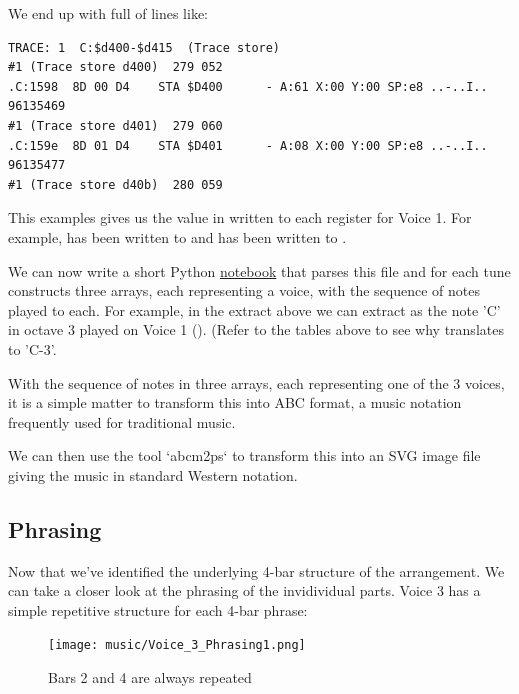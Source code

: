 \begin{definition}
We end up with  full of lines like:

\begin{lstlisting}[basicstyle=\tiny,escapechar=\%]
TRACE: 1  C:$d400-$d415  (Trace store)
#1 (Trace store d400)  279 052
.C:1598  8D 00 D4    STA $D400      - A:61 X:00 Y:00 SP:e8 ..-..I..   96135469
#1 (Trace store d401)  279 060
.C:159e  8D 01 D4    STA $D401      - A:08 X:00 Y:00 SP:e8 ..-..I..   96135477
#1 (Trace store d40b)  280 059
\end{lstlisting}

This examples gives us the value in  written to each register for Voice 1. For example, 
has been written to  and  has been written to .

We can now write a short Python \href{https://github.com/mwenge/iatheory/tree/main/notebooks}{notebook} that
parses this file and for each tune constructs three arrays, each representing a voice, with the sequence
of notes played to each. For example, in the extract above we can extract  as the note 'C'
in octave 3 played on Voice 1 (). (Refer to the tables above to see why 
translates to 'C-3'.

With the sequence of notes in three arrays, each representing one of the 3 voices, it is a simple
matter to transform this into ABC format, a music notation frequently used for traditional music.



We can then use the tool `abcm2ps` to transform this into an SVG image file giving the music in
standard Western notation.

\end{definition}

\subsection{Phrasing}
Now that we've identified the underlying 4-bar structure of the arrangement. We can take a closer look at the 
phrasing of the invidividual parts. Voice 3 has a simple repetitive structure for each 4-bar phrase:

\begin{figure}[H]
{
  \begin{adjustbox}{width=11cm,center}
  \texttt{[image: music/Voice\_3\_Phrasing1.png]}%
    \end{adjustbox}
}\caption[]{Bars 2 and 4 are always repeated}
\end{figure}

